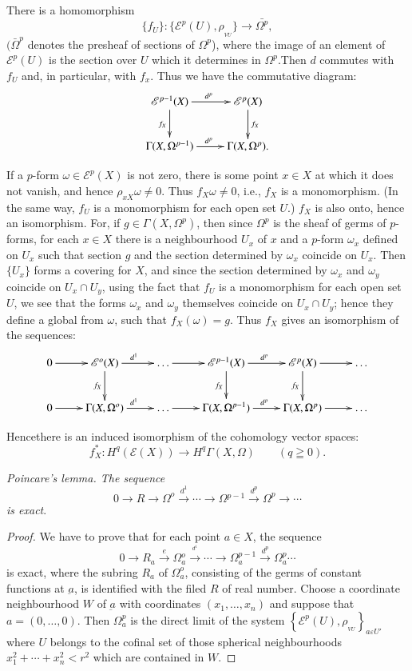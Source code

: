 There is a homomorphism
$$
\{f_U\} :\{\mathscr{E}^p (U), \rho_{_{VU}}\} \to \bar{\Omega^p}, 
$$
$(\bar{\Omega}^p$ denotes the presheaf of sections of $\Omega^p$),
where the image of an element of $\mathscr{E}^p (U)$ is the section
over $U$ which it determines in $\Omega^p$.\pageoriginale Then $d$ commutes with
$f_U$ and, in particular, with $f_x $. Thus we have the commutative
diagram: 
\[
\xymatrix{
\mathscr{E}^{p-1}(X)\ar[r]^{d^p}\ar[d]_{f_X} &
\mathscr{E}^p(X)\ar[d]^{f_X}\\
\Gamma (X,\Omega^{p-1}) \ar[r]^{d^p} & \Gamma (X,\Omega^p).
}
\]

If a $p$-form $\omega \in \mathscr{E}^p (X)$ is not zero, there
is some point $x \in X$ at which it does not vanish, and hence
$\rho_{x X} \omega \neq 0$. Thus $f_X \omega \neq 0$, i.e., $f_X$ is a
monomorphism. (In the same way, $f_U$ is a monomorphism for each open
set $U$.) $f_X$ is also onto, hence an isomorphism. For, if $g
\in \Gamma (X, \Omega^p)$, then since $\Omega^p$ is the sheaf
of germs of $p$-forms, for each $x \in X$ there is a
neighbourhood $U_x$ of $x$ and a $p$-form $\omega_x$ defined on $U_x$
such that section $g$ and the section determined by $\omega_x$
coincide on $U_x$. Then $\{ U_x\}$ forms a covering for $X$, and since
the section determined by $\omega_x$ and $\omega_y$ coincide on $U_x
\cap U_y$, using the fact that $f_U$ is a monomorphism for each open
set $U$, we see that the forms $\omega_x$ and $\omega_y$ themselves
coincide on $U_x \cap U_y$; hence they define a global from $\omega$,
such that $f_X(\omega) = g$. Thus $f_X$ gives an isomorphism of the
sequences:  
\[
\xymatrix{
0\ar[r] & \mathscr{E}^{o}(X) \ar[r]^{d^1} \ar[d]_{f_X} & \ldots
\ar[r]& \mathscr{E}^{p-1}(X)\ar[r]^{d^p} \ar[d]_{f_X} &
\mathscr{E}^p(X) \ar[r] \ar[d]_{f_X} & \ldots\\
0 \ar[r] & \Gamma(X,\Omega^o) \ar[r]^{d^1} & \ldots \ar[r] &
\Gamma(X,\Omega^{p-1}) \ar[r]^{d^p} & \Gamma (X,\Omega^p)\ar[r] & \ldots
 }
\]

 Hence\pageoriginale there is an induced isomorphism of the cohomology
 vector  spaces:  
 $$
 f^*_X : H^q (\mathscr{E} (X)) \to H^q \Gamma (X, \Omega) \qquad (q
 \geqq 0). 
 $$

 \textit{Poincare's lemma. The sequence} 
 $$
 0 \to R \to \Omega^o \xrightarrow {d^1} \cdots \to \Omega{^{p-1}}
 \xrightarrow{d^p} \Omega^p \to \cdots 
 $$
 \textit{is exact}.

 \begin{proof}
We have to prove that for each point $a \in X$, the sequence 
$$ 
0 \to R_a \xrightarrow{e} \Omega{^o_a} \xrightarrow{^{d^1}} \cdots \to
\Omega^{p-1}_a \xrightarrow{d^p} \Omega^p_a \cdots 
$$
is exact, where the subring $R_a$ of $\Omega^o_a$, consisting of the
germs of constant functions at $\underbar{a}$, is identified with the
filed $R$ of real number. Choose a coordinate neighbourhood $W$ of
$\underbar{a}$ with coordinates $(x_1 ,\ldots,x_n)$ and suppose that $a
=(0,\ldots,0)$. Then $\Omega^p_a$ is the direct limit of the system
$\left\{\mathscr{E}^p (U), \rho_{_{VU}} \right\}_{a \varepsilon U'}$
where $U$ belongs to the cofinal set of those spherical neighbourhoods
$x^2_1 + \cdots + x^2_n < r^2$ which are contained in $W$.   
 \end{proof} 
 
